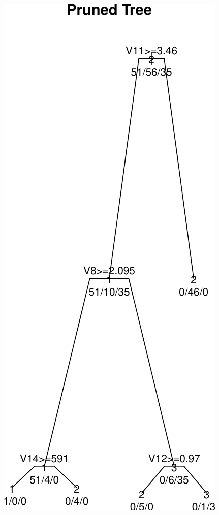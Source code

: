 \documentclass[]{article}
\begin{document}
~

\newpage

\begin{center}\includegraphics{HW4_Solution_files/figure-latex/unnamed-chunk-7-1} \end{center}
\end{document}
